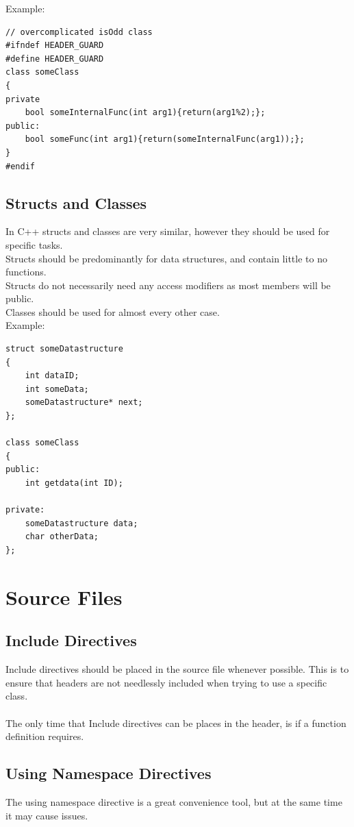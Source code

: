 \documentclass[12pt,article]{memoir}
\begin{document}
\noindent
Example:
\begin{lstlisting}
// overcomplicated isOdd class 
#ifndef HEADER_GUARD
#define HEADER_GUARD
class someClass
{
private
	bool someInternalFunc(int arg1){return(arg1%2);};
public:
	bool someFunc(int arg1){return(someInternalFunc(arg1));};
}
#endif
\end{lstlisting}

\newpage
\subsection{Structs and Classes}
In C++ structs and classes are very similar, however they should be used for specific tasks.\\

Structs should be predominantly for data structures, and contain little to no functions.\\

Structs do not necessarily  need any access modifiers as most members will be public.\\

Classes should be used for almost every other case.\\

\noindent
Example:
\begin{lstlisting}
struct someDatastructure
{
	int dataID;
	int someData;
	someDatastructure* next;
};

class someClass
{
public:
	int getdata(int ID);

private:
	someDatastructure data;
	char otherData;
};
\end{lstlisting}

\newpage
\section{Source Files}
\subsection{Include Directives}
Include directives should be placed in the source file whenever possible. This is to ensure that headers are not needlessly included when trying to use a specific class.\\\\

\noindent
The only time that Include directives can be places in the header, is if a function definition requires.\\

\subsection{Using Namespace Directives}
The using namespace directive is a great convenience tool, but at the same time it may cause issues.\\\\
\end{document}
